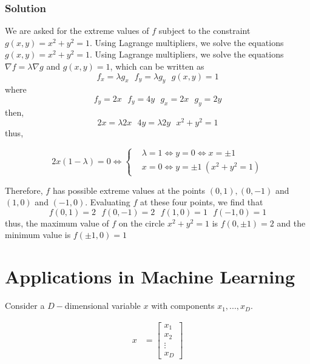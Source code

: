 \subsubsection{Solution}
We are asked for the extreme values of $f$ subject to the constraint $g(x, y)=x^2 + y^2=1$. Using Lagrange multipliers, we solve the equations $g(x, y)=x^2 + y^2=1$. Using Lagrange multipliers, we solve the equations $\nabla f = \lambda \nabla g$ and $g(x, y)=1$, which can be written as
\begin{equation}
    f_x = \lambda g_x \ \ \ f_y = \lambda g_y \ \ \ g(x, y)=1
\end{equation}
where
\begin{equation}
    f_y = 2x \ \ \ f_y = 4y \ \ \ g_x = 2x \ \ \ g_y = 2y
\end{equation}
then,
\begin{equation}
    2x = \lambda 2x \ \ \ 4y = \lambda 2y \ \ \ x^2 + y^2 = 1
\end{equation}
thus,

\begin{equation}
    2x(1 - \lambda) = 0 \Leftrightarrow
  \left\{
    \begin{aligned}
      & \lambda = 1 \Leftrightarrow y = 0 \Leftrightarrow x= \pm 1\\
      & x = 0 \Leftrightarrow y = \pm 1\ (x^2 + y^2=1)
    \end{aligned}
  \right.
\end{equation}

Therefore, $f$ has possible extreme values at the points $(0, 1), (0, -1)$ and $(1, 0)$ and $(-1, 0)$. Evaluating $f$ at these four points, we find that
\begin{equation}
    f(0, 1) = 2 \ \ \ f(0, -1) = 2 \ \ \ f(1, 0) = 1 \ \ \ f(-1, 0) = 1
\end{equation}
thus, the maximum value of $f$ on the circle $x^2 + y^2=1$ is $f(0, \pm 1)=2$ and the minimum value is $f(\pm 1, 0)=1$

\section{Applications in Machine Learning}
Consider a $D-$dimensional variable \textbf{$x$} with components $x_1, ..., x_D$.

\begin{align}
    x &= \begin{bmatrix}
           x_{1} \\
           x_{2} \\
           \vdots \\
           x_{D}
         \end{bmatrix}
\end{align}

